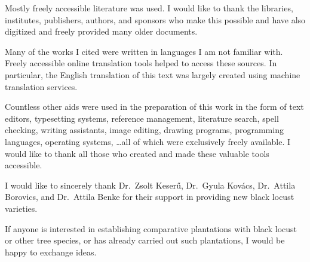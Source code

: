 Mostly freely accessible literature was used. I would like to thank the libraries, institutes, publishers, authors, and sponsors who make this possible and have also digitized and freely provided many older documents.

Many of the works I cited were written in languages I am not familiar with. Freely accessible online translation tools helped to access these sources. In particular, the English translation of this text was largely created using machine translation services.

Countless other aids were used in the preparation of this work in the form of text editors, typesetting systems, reference management, literature search, spell checking, writing assistants, image editing, drawing programs, programming languages, operating systems, \dots all of which were exclusively freely available. I would like to thank all those who created and made these valuable tools accessible.

I would like to sincerely thank Dr.~Zsolt Keserű, Dr.~Gyula Kovács, Dr.~Attila Borovics, and Dr.~Attila Benke for their support in providing new black locust varieties.

If anyone is interested in establishing comparative plantations with black locust or other tree species, or has already carried out such plantations, I would be happy to exchange ideas.
